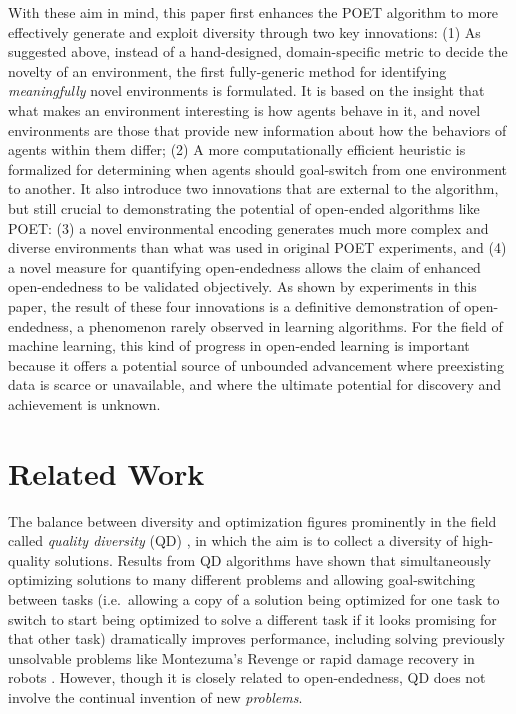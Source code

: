 \documentclass{article}
\newcommand{\ks}[1]{\comments{\textcolor{purple}{[Ken: #1]}}}
\newcommand{\comments}[1]{#1} %
\begin{document}
With these aim in mind, this paper first enhances the POET algorithm to more effectively generate and exploit diversity through two key innovations:
(1) As suggested above, instead of a hand-designed, domain-specific metric to decide the novelty of an environment, the first fully-generic method for identifying \emph{meaningfully} novel environments is formulated.  It is based on the insight that what makes an environment interesting is how agents behave in it, and novel environments are those that provide new information about how the behaviors of agents within them differ; 
(2) A more computationally efficient heuristic is formalized for determining when agents should goal-switch from one environment to another.
It also introduce two innovations that are external to the algorithm, but still crucial to demonstrating the potential of open-ended algorithms like POET: (3) a novel environmental encoding generates much more complex and diverse environments than what was used in original POET experiments,  and (4) a novel measure for quantifying open-endedness allows the claim of enhanced open-endedness to be validated objectively. As shown by experiments in this paper, the result of these four
innovations is a definitive demonstration of
open-endedness, a phenomenon rarely observed in learning algorithms.
For the field of machine learning, this kind of progress in open-ended learning is important because it offers a potential source of unbounded advancement where preexisting data is scarce or unavailable, and where the ultimate potential for discovery and achievement is unknown.

\section{Related Work}
\label{related_work}

The balance between diversity and optimization figures prominently in the field called \emph{quality diversity} (QD) \cite{pugh:frontiers16, lehman:gecco11, mouret:arxiv15}, in which the aim is to collect a diversity of high-quality solutions. Results from QD algorithms have shown that simultaneously optimizing solutions to many different problems and allowing goal-switching between tasks (i.e.\ allowing a copy of a solution being optimized for one task to switch to start being optimized to solve a different task if it looks promising for that other task) dramatically improves performance, including solving previously unsolvable problems like Montezuma's Revenge or rapid damage recovery in robots \cite{cully:nature15,nguyen2016understanding, ecoffet2019go, lehman:gecco11, mouret:arxiv15}. However, though it is closely related to open-endedness, QD does not involve the continual invention of new \emph{problems}.
\end{document}
